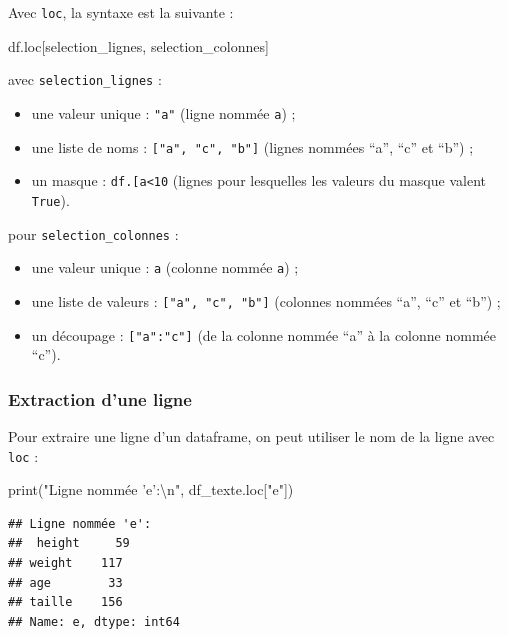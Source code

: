 \documentclass[12pt,]{book}
\newenvironment{Shaded}{\begin{snugshade}}{\end{snugshade}}
\newcommand{\CharTok}[1]{\textcolor[rgb]{0.31,0.60,0.02}{#1}}
\newcommand{\StringTok}[1]{\textcolor[rgb]{0.31,0.60,0.02}{#1}}
\newcommand{\BuiltInTok}[1]{#1}
\newcommand{\NormalTok}[1]{#1}
\providecommand{\tightlist}{%
  \setlength{\itemsep}{0pt}\setlength{\parskip}{0pt}}
\numberwithin{equation}{section}
\numberwithin{countremarque}{section}
\begin{document}
Avec \texttt{loc}, la syntaxe est la suivante :

\begin{Shaded}
\begin{Highlighting}[]
\NormalTok{df.loc[selection_lignes, selection_colonnes]}
\end{Highlighting}
\end{Shaded}

avec \texttt{selection\_lignes} :

\begin{itemize}
\tightlist
\item
  une valeur unique : \texttt{"a"} (ligne nommée \texttt{a}) ;
\item
  une liste de noms : \texttt{{[}"a",\ "c",\ "b"{]}} (lignes nommées
  ``a'', ``c'' et ``b'') ;
\item
  un masque :
  \texttt{df.{[}\textquotesingle{}a\textquotesingle{}{]}\textless{}10}
  (lignes pour lesquelles les valeurs du masque valent \texttt{True}).
\end{itemize}

pour \texttt{selection\_colonnes} :

\begin{itemize}
\tightlist
\item
  une valeur unique : \texttt{a} (colonne nommée \texttt{a}) ;
\item
  une liste de valeurs : \texttt{{[}"a",\ "c",\ "b"{]}} (colonnes
  nommées ``a'', ``c'' et ``b'') ;
\item
  un découpage : \texttt{{[}"a":"c"{]}} (de la colonne nommée ``a'' à la
  colonne nommée ``c'').
\end{itemize}

\subsubsection{Extraction d'une ligne}\label{extraction-dune-ligne}

Pour extraire une ligne d'un dataframe, on peut utiliser le nom de la
ligne avec \texttt{loc} :

\begin{Shaded}
\begin{Highlighting}[]
\BuiltInTok{print}\NormalTok{(}\StringTok{"Ligne nommée 'e':}\CharTok{\textbackslash{}n}\StringTok{"}\NormalTok{, df_texte.loc[}\StringTok{"e"}\NormalTok{])}
\end{Highlighting}
\end{Shaded}

\begin{lstlisting}
## Ligne nommée 'e':
##  height     59
## weight    117
## age        33
## taille    156
## Name: e, dtype: int64
\end{lstlisting}
\end{document}
